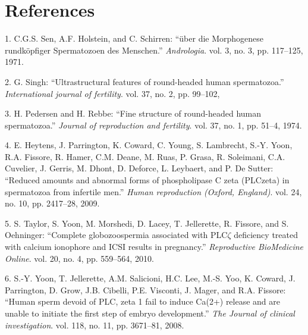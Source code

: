 \documentclass[12pt,twoside]{reedthesis}
\begin{document}
  \backmatter
  
  \chapter*{References}\label{references}
  
  \noindent
  
  \setlength{\parindent}{-0.20in} \setlength{\leftskip}{0.20in}
  \setlength{\parskip}{8pt}
  
  \hypertarget{refs}{}
  \hypertarget{ref-Sen2009}{}
  1. C.G.S. Sen, A.F. Holstein, and C. Schirren: ``über die Morphogenese
  rundköpfiger Spermatozoen des Menschen.'' \emph{Andrologia}. vol. 3, no.
  3, pp. 117--125, 1971.
  
  \hypertarget{ref-Singh}{}
  2. G. Singh: ``Ultrastructural features of round-headed human
  spermatozoa.'' \emph{International journal of fertility}. vol. 37, no.
  2, pp. 99--102,
  
  \hypertarget{ref-Pedersen1974}{}
  3. H. Pedersen and H. Rebbe: ``Fine structure of round-headed human
  spermatozoa.'' \emph{Journal of reproduction and fertility}. vol. 37,
  no. 1, pp. 51--4, 1974.
  
  \hypertarget{ref-Heytens2009}{}
  4. E. Heytens, J. Parrington, K. Coward, C. Young, S. Lambrecht, S.-Y.
  Yoon, R.A. Fissore, R. Hamer, C.M. Deane, M. Ruas, P. Grasa, R.
  Soleimani, C.A. Cuvelier, J. Gerris, M. Dhont, D. Deforce, L. Leybaert,
  and P. De Sutter: ``Reduced amounts and abnormal forms of phospholipase
  C zeta (PLCzeta) in spermatozoa from infertile men.'' \emph{Human
  reproduction (Oxford, England)}. vol. 24, no. 10, pp. 2417--28, 2009.
  
  \hypertarget{ref-Taylor2010}{}
  5. S. Taylor, S. Yoon, M. Morshedi, D. Lacey, T. Jellerette, R. Fissore,
  and S. Oehninger: ``Complete globozoospermia associated with
  PLC\(\zeta\) deficiency treated with calcium ionophore and ICSI results
  in pregnancy.'' \emph{Reproductive BioMedicine Online}. vol. 20, no. 4,
  pp. 559--564, 2010.
  
  \hypertarget{ref-Yoon2008}{}
  6. S.-Y. Yoon, T. Jellerette, A.M. Salicioni, H.C. Lee, M.-S. Yoo, K.
  Coward, J. Parrington, D. Grow, J.B. Cibelli, P.E. Visconti, J. Mager,
  and R.A. Fissore: ``Human sperm devoid of PLC, zeta 1 fail to induce
  Ca(2+) release and are unable to initiate the first step of embryo
  development.'' \emph{The Journal of clinical investigation}. vol. 118,
  no. 11, pp. 3671--81, 2008.
  
\end{document}
